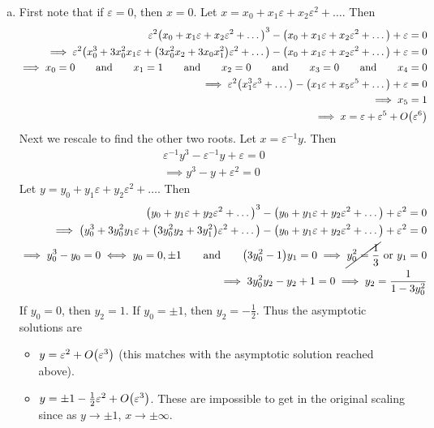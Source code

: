 \documentclass{article} %
\theoremstyle{plain}
\newcommand{\E}{\varepsilon}
\numberwithin{equation}{section} %
\numberwithin{figure}{section} %
\numberwithin{table}{section} %
\begin{document}
\begin{enumerate}[(a)]
    \item
        First note that if $\E = 0$, then $x = 0$.  Let $x = x_0 + x_1 \E + x_2 \E^2 + \dots$.  Then
        \begin{align*}
            \E^2\qty(x_0 + x_1 \E + x_2 \E^2 + \dots)^3 - \qty(x_0 + x_1 \E + x_2 \E^2 + \dots) + \E = 0 \\
            \implies \E^2\qty(x_0^3 + 3x_0^2x_1 \E + \qty(3x_0^2x_2 + 3x_0x_1^2) \E^2 + \dots) - \qty(x_0 + x_1\E + x_2 \E^2 + \dots) + \E = 0 \\
            \implies x_0 = 0 \qquad \text{and} \qquad x_1 = 1 \qquad \text{and} \qquad x_2 = 0 \qquad \text{and} \qquad x_3 = 0 \qquad \text{and} \qquad x_4 = 0 \\
            \implies \E^2\qty(x_1^3\E^3 + \dots) - \qty(x_1\E + x_5 \E^5 + \dots) + \E = 0 \\
            \implies x_5 = 1 \\
            \implies x = \E + \E^5 + O\qty(\E^6)
        \end{align*}
        Next we rescale to find the other two roots.  Let $x = \E^{-1} y$.  Then
        \begin{align*}
            \E^{-1}y^3 - \E^{-1}y + \E = 0 \\
            \implies y^3 - y + \E^2 = 0
        \end{align*}
        Let $y = y_0 + y_1 \E + y_2 \E^2 + \dots$.  Then
        \begin{align*}
            \qty(y_0 + y_1 \E + y_2 \E^2 + \dots)^3 - \qty(y_0 + y_1 \E + y_2 \E^2 + \dots) + \E^2 = 0 \\
            \implies \qty(y_0^3 + 3y_0^2y_1 \E + \qty(3y_0^2y_2 + 3y_1^2)\E^2 + \dots) - \qty(y_0 + y_1 \E + y_2 \E^2 + \dots) + \E^2 = 0 \\
            \implies y_0^3 - y_0 = 0 \iff y_0 = 0, \pm 1 \qquad \text{and} \qquad \qty(3y_0^2 - 1)y_1 = 0 \implies \cancel{y_0^2 = \frac{1}{3}} \text{ or } y_1 = 0 \\
            \implies 3y_0^2y_2 - y_2 + 1 = 0 \implies y_2 = \frac{1}{1 - 3y_0^2}
        \end{align*}
        If $y_0 = 0$, then $y_2 = 1$.  If $y_0 = \pm 1$, then $y_2 = -\frac{1}{2}$.  Thus the asymptotic solutions are
        \begin{itemize}
            \item $y = \E^2 + O\qty(\E^3)$ (this matches with the asymptotic solution reached above).
            \item $y = \pm 1 - \frac{1}{2}\E^2 + O\qty(\E^3)$.  These are impossible to get in the original scaling since as $y \rightarrow \pm 1$, $x \rightarrow \pm \infty$.

\end{itemize}
\end{enumerate}
\end{document}
